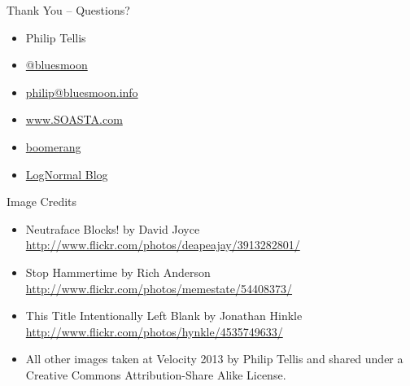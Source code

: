 \documentclass{beamer}
\begin{document}
\begin{frame}{Thank You -- Questions?}
  \begin{itemize}
  \item Philip Tellis
  \item \href{http://twitter.com/bluesmoon}{@bluesmoon}
  \item \href{http://bluesmoon.info/}{philip@bluesmoon.info}
  \item \href{http://www.soasta.com/}{www.SOASTA.com}
  \item \href{http://lognormal.github.com/boomerang/doc/}{boomerang}
  \item \href{http://www.lognormal.com/blog/}{LogNormal Blog}
  \end{itemize}
\end{frame}

\begin{frame}{Image Credits}
\begin{itemize}
  \item Neutraface Blocks! by David Joyce \\ \small \href{http://www.flickr.com/photos/deapeajay/3913282801/}{http://www.flickr.com/photos/deapeajay/3913282801/}
  \item Stop Hammertime by Rich Anderson \\ \small \href{http://www.flickr.com/photos/memestate/54408373/}{http://www.flickr.com/photos/memestate/54408373/}
  \item This Title Intentionally Left Blank by Jonathan Hinkle \\ \small \href{http://www.flickr.com/photos/hynkle/4535749633/}{http://www.flickr.com/photos/hynkle/4535749633/}
  \item All other images taken at Velocity 2013 by Philip Tellis and shared under a Creative Commons Attribution-Share Alike License.
\end{itemize}
\end{frame}
\end{document}
